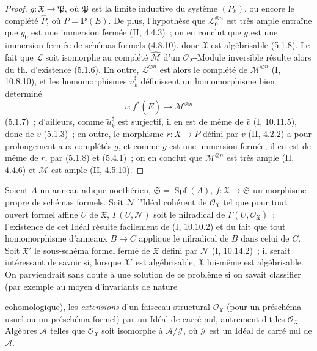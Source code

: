 \begin{proof}
$g:\mathfrak X\to\mathfrak P$, où $\mathfrak P$ est la limite inductive du
système $(P_k)$, ou encore le complété $\widehat P$, où $P=\mathbf P(E)$. De
plus, l'hypothèse que $\mathcal L_0^{\otimes n}$ est très ample entraîne que
$g_0$ est une immersion fermée (II, 4.4.3)~; on en conclut que $g$ est une
immersion fermée de schémas formels (4.8.10), donc $\mathfrak X$ est
algébrisable (5.1.8). Le fait que $\mathcal L$ soit isomorphe au complété
$\widehat{\mathcal M}$ d'un $\mathcal O_X$-Module inversible résulte alors du
th. d'existence (5.1.6). En outre, $\mathcal L^{\otimes n}$ est alors le
complété de $\mathcal M^{\otimes n}$ (I, 10.8.10), et les homomorphismes
$\widetilde u_k^\sharp$ définissent un homomorphisme bien déterminé
\[
v:f^*(\widetilde E)\longrightarrow\mathcal M^{\otimes n}
\]
(5.1.7)~; d'ailleurs, comme $\widetilde u_k^\sharp$ est surjectif, il en est de
même de $\widehat v$ (I, 10.11.5), donc de $v$ (5.1.3)~; en outre, le morphisme
$r:X\to P$ défini par $v$ (II, 4.2.2) a pour prolongement aux complétés $g$,
et comme $g$ est une immersion fermée, il en est de même de $r$, par (5.1.8)
et (5.4.1)~; on en conclut que $\mathcal M^{\otimes n}$ est très ample
(II, 4.4.6) et $\mathcal M$ est ample (II, 4.5.10).
\end{proof}

\begin{remark}[5.4.6]
\label{III.5.4.6-fr}
Soient $A$ un anneau adique noethérien,
$\mathfrak S=\operatorname{Spf}(A)$,
$f:\mathfrak X\to\mathfrak S$ un morphisme propre de schémas formels. Soit
$\mathcal N$ l'Idéal cohérent de $\mathcal O_{\mathfrak X}$ tel que pour tout
ouvert formel affine $U$ de $\mathfrak X$, $\Gamma(U,\mathcal N)$ soit le
nilradical de $\Gamma(U,\mathcal O_{\mathfrak X})$~; l'existence de cet Idéal
résulte facilement de (I, 10.10.2) et du fait que tout homomorphisme d'anneaux
$B\to C$ applique le nilradical de $B$ dans celui de $C$. Soit
$\mathfrak X'$ le sous-schéma formel fermé de $\mathfrak X$ défini par
$\mathcal N$ (I, 10.14.2)~; il serait intéressant de savoir si, lorsque
$\mathfrak X'$ est algébrisable, $\mathfrak X$ lui-même est algébrisable. On
parviendrait sans doute à une solution de ce problème si on savait classifier
(par exemple au moyen d'invariants de nature


cohomologique), les \emph{extensions} d'un faisceau structural
$\mathcal O_{\mathfrak X}$ (pour un préschéma usuel ou un préschéma formel) par
un Idéal de carré nul, autrement dit les $\mathcal O_{\mathfrak X}$-Algèbres
$\mathcal A$ telles que $\mathcal O_{\mathfrak X}$ soit isomorphe à
$\mathcal A/\mathcal J$, où $\mathcal J$ est un Idéal de carré nul de
$\mathcal A$.
\end{remark}


